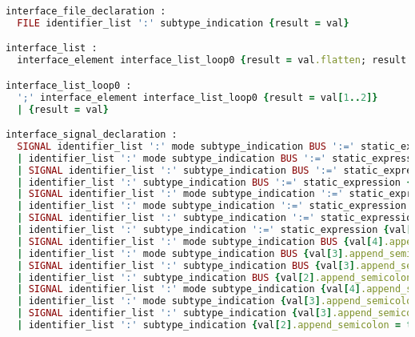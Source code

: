 \begin{lstlisting}[language=Ruby, style=rubystyle]
interface_file_declaration :
  FILE identifier_list ':' subtype_indication {result = val}

interface_list :
  interface_element interface_list_loop0 {result = val.flatten; result.last.type.append_semicolon = false; }

interface_list_loop0 :
  ';' interface_element interface_list_loop0 {result = val[1..2]}
  | {result = val}

interface_signal_declaration :
  SIGNAL identifier_list ':' mode subtype_indication BUS ':=' static_expression {val[4].append_semicolon = true ;result = SignalDeclaration.new(val[0],val[1], val[3], val[4], val[7]);  }
  | identifier_list ':' mode subtype_indication BUS ':=' static_expression {val[3].append_semicolon = true ;result = SignalDeclaration.new(nil, val[0], val[2], val[3], val[6]);  }
  | SIGNAL identifier_list ':' subtype_indication BUS ':=' static_expression {val[3].append_semicolon = true ;result = SignalDeclaration.new(val[0],val[1], nil, val[3], val[6]);  }
  | identifier_list ':' subtype_indication BUS ':=' static_expression {val[2].append_semicolon = true ;result = SignalDeclaration.new(nil, val[0], nil, val[2], val[5] ); }
  | SIGNAL identifier_list ':' mode subtype_indication ':=' static_expression {val[4].append_semicolon = true ;result = SignalDeclaration.new(val[0],val[1], val[3], val[4], val[6]);  }
  | identifier_list ':' mode subtype_indication ':=' static_expression {val[3].append_semicolon = true ;result = SignalDeclaration.new(nil, val[0], val[2], val[3], val[5]);  }
  | SIGNAL identifier_list ':' subtype_indication ':=' static_expression {val[3].append_semicolon = true ;result = SignalDeclaration.new(val[0], val[1], nil, val[3],val[5]);  }
  | identifier_list ':' subtype_indication ':=' static_expression {val[2].append_semicolon = true ;result = SignalDeclaration.new(nil, val[0], nil, val[2], val[4]);  }
  | SIGNAL identifier_list ':' mode subtype_indication BUS {val[4].append_semicolon = true ;result = SignalDeclaration.new(val[0], val[1], val[3], val[4]);  }
  | identifier_list ':' mode subtype_indication BUS {val[3].append_semicolon = true ;result = SignalDeclaration.new(nil, val[0], val[2], val[3]);  }
  | SIGNAL identifier_list ':' subtype_indication BUS {val[3].append_semicolon = true ;result = SignalDeclaration.new(val[0], val[1], nil, val[3]);  }
  | identifier_list ':' subtype_indication BUS {val[2].append_semicolon = true ;result = SignalDeclaration.new(nil, val[0], nil, val[2]);  }
  | SIGNAL identifier_list ':' mode subtype_indication {val[4].append_semicolon = true ;result = SignalDeclaration.new(val[0], val[1], val[3], val[4]);  }
  | identifier_list ':' mode subtype_indication {val[3].append_semicolon = true ;result = SignalDeclaration.new(nil, val[0], val[2], val[3]);}
  | SIGNAL identifier_list ':' subtype_indication {val[3].append_semicolon = true ;result = SignalDeclaration.new(val[0], val[1], nil, val[3]); }
  | identifier_list ':' subtype_indication {val[2].append_semicolon = true ;result = SignalDeclaration.new(nil, val[0], nil, val[2]);  }


\end{lstlisting}
